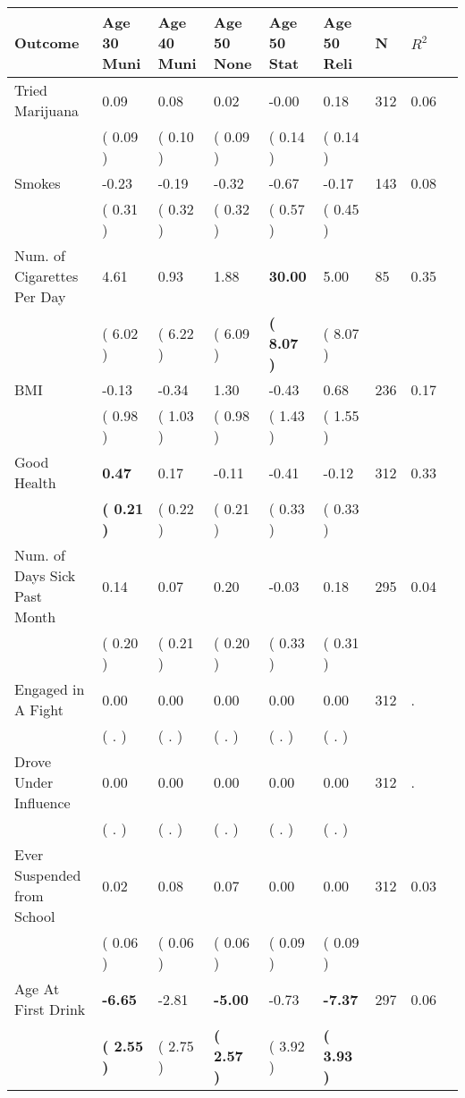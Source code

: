 \begin{tabular}{L{6.2cm} C{1.8cm} C{1.8cm} C{1.8cm} C{1.8cm} C{1.8cm} C{1.8cm} C{0.3cm} C{0.3cm}}
\toprule
 \textbf{Outcome} & \textbf{Age 30 Muni} & \textbf{Age 40 Muni} & \textbf{Age 50 None} & \textbf{Age 50 Stat} & \textbf{Age 50 Reli} & \textbf{N} & \textbf{$ R^2$} \\
\midrule
Tried Marijuana &      0.09 &      0.08 &      0.02 &     -0.00 &      0.18  & 312 &       0.06 \\ 
 & (     0.09 ) & (     0.10 ) & (     0.09 ) & (     0.14 ) & (     0.14 )  & \\
Smokes &     -0.23 &     -0.19 &     -0.32 &     -0.67 &     -0.17  & 143 &       0.08 \\ 
 & (     0.31 ) & (     0.32 ) & (     0.32 ) & (     0.57 ) & (     0.45 )  & \\
Num. of Cigarettes Per Day &      4.61 &      0.93 &      1.88 & \textbf{    30.00} &      5.00  & 85 &       0.35 \\ 
 & (     6.02 ) & (     6.22 ) & (     6.09 ) & \textbf{(     8.07 )} & (     8.07 )  & \\
BMI &     -0.13 &     -0.34 &      1.30 &     -0.43 &      0.68  & 236 &       0.17 \\ 
 & (     0.98 ) & (     1.03 ) & (     0.98 ) & (     1.43 ) & (     1.55 )  & \\
Good Health & \textbf{     0.47} &      0.17 &     -0.11 &     -0.41 &     -0.12  & 312 &       0.33 \\ 
 & \textbf{(     0.21 )} & (     0.22 ) & (     0.21 ) & (     0.33 ) & (     0.33 )  & \\
Num. of Days Sick Past Month &      0.14 &      0.07 &      0.20 &     -0.03 &      0.18  & 295 &       0.04 \\ 
 & (     0.20 ) & (     0.21 ) & (     0.20 ) & (     0.33 ) & (     0.31 )  & \\
Engaged in A Fight &      0.00 &      0.00 &      0.00 &      0.00 &      0.00  & 312 &          . \\ 
 & (        . ) & (        . ) & (        . ) & (        . ) & (        . )  & \\
Drove Under Influence &      0.00 &      0.00 &      0.00 &      0.00 &      0.00  & 312 &          . \\ 
 & (        . ) & (        . ) & (        . ) & (        . ) & (        . )  & \\
Ever Suspended from School &      0.02 &      0.08 &      0.07 &      0.00 &      0.00  & 312 &       0.03 \\ 
 & (     0.06 ) & (     0.06 ) & (     0.06 ) & (     0.09 ) & (     0.09 )  & \\
Age At First Drink & \textbf{    -6.65} &     -2.81 & \textbf{    -5.00} &     -0.73 & \textbf{    -7.37}  & 297 &       0.06 \\ 
 & \textbf{(     2.55 )} & (     2.75 ) & \textbf{(     2.57 )} & (     3.92 ) & \textbf{(     3.93 )}  & \\
\bottomrule
\end{tabular}
